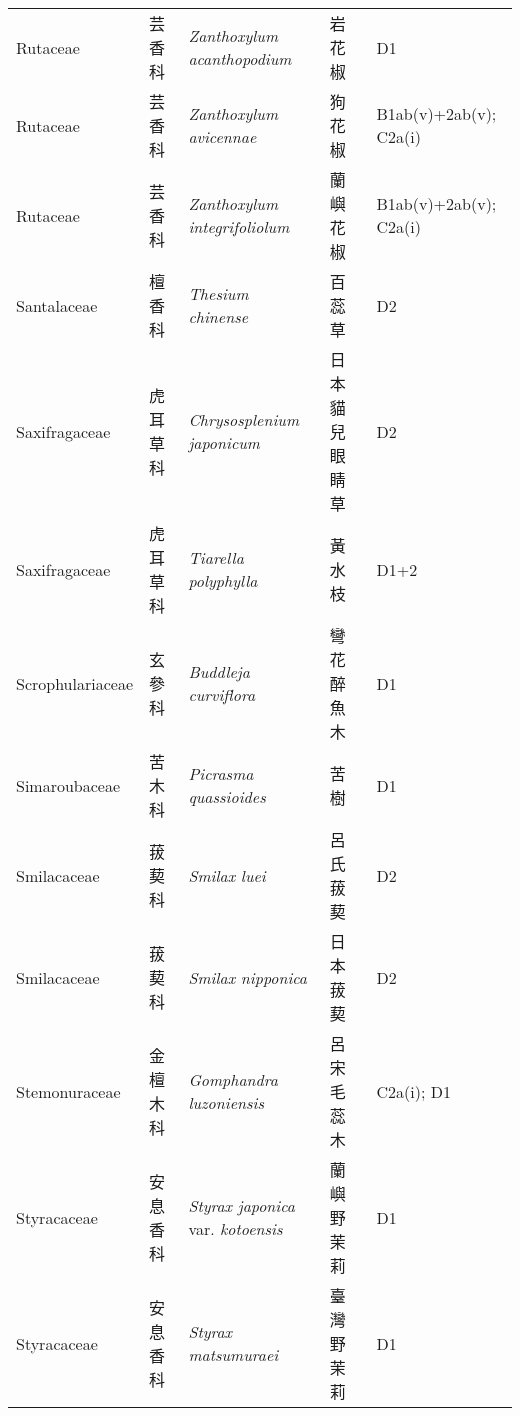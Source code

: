 {\begin{longtable}{p{2.5cm}p{2.5cm}p{4.5cm}p{2.5cm}p{3cm}}
    Rutaceae & 芸香科 & \textit{Zanthoxylum acanthopodium}  & 岩花椒 & D1 \index{Zanthoxylum@\textit{Zanthoxylum}!acanthopodium@\textit{acanthopodium}}  \index{岩花椒} \\
    Rutaceae & 芸香科 & \textit{Zanthoxylum avicennae}  & 狗花椒 & B1ab(v)+2ab(v); C2a(i) \index{Zanthoxylum@\textit{Zanthoxylum}!avicennae@\textit{avicennae}}  \index{狗花椒} \\
    Rutaceae & 芸香科 & \textit{Zanthoxylum integrifoliolum}  & 蘭嶼花椒 & B1ab(v)+2ab(v); C2a(i) \index{Zanthoxylum@\textit{Zanthoxylum}!integrifoliolum@\textit{integrifoliolum}}  \index{蘭嶼花椒} \\
    Santalaceae & 檀香科 & \textit{Thesium chinense}  & 百蕊草 & D2 \index{Thesium@\textit{Thesium}!chinense@\textit{chinense}}  \index{百蕊草} \\
    Saxifragaceae & 虎耳草科 & \textit{Chrysosplenium japonicum}  & 日本貓兒眼睛草 & D2 \index{Chrysosplenium@\textit{Chrysosplenium}!japonicum@\textit{japonicum}}  \index{日本貓兒眼睛草} \\
    Saxifragaceae & 虎耳草科 & \textit{Tiarella polyphylla}  & 黃水枝 & D1+2 \index{Tiarella@\textit{Tiarella}!polyphylla@\textit{polyphylla}}  \index{黃水枝} \\
    Scrophulariaceae & 玄參科 & \textit{Buddleja curviflora}  & 彎花醉魚木 & D1 \index{Buddleja@\textit{Buddleja}!curviflora@\textit{curviflora}}  \index{彎花醉魚木} \\
    Simaroubaceae & 苦木科 & \textit{Picrasma quassioides}  & 苦樹 & D1 \index{Picrasma@\textit{Picrasma}!quassioides@\textit{quassioides}}  \index{苦樹} \\
    Smilacaceae & 菝葜科 & \textit{Smilax luei}  & 呂氏菝葜 & D2 \index{Smilax@\textit{Smilax}!luei@\textit{luei}}  \index{呂氏菝葜} \\
    Smilacaceae & 菝葜科 & \textit{Smilax nipponica}  & 日本菝葜 & D2 \index{Smilax@\textit{Smilax}!nipponica@\textit{nipponica}}  \index{日本菝葜} \\
    Stemonuraceae & 金檀木科 & \textit{Gomphandra luzoniensis}  & 呂宋毛蕊木 & C2a(i); D1 \index{Gomphandra@\textit{Gomphandra}!luzoniensis@\textit{luzoniensis}}  \index{呂宋毛蕊木} \\
    Styracaceae & 安息香科 & \textit{Styrax japonica} var. \textit{kotoensis}  & 蘭嶼野茉莉 & D1 \index{Styrax@\textit{Styrax}!japonica@\textit{japonica}!var. kotoensis@var. \textit{kotoensis}}  \index{蘭嶼野茉莉} \\
    Styracaceae & 安息香科 & \textit{Styrax matsumuraei}  & 臺灣野茉莉 & D1 \index{Styrax@\textit{Styrax}!matsumuraei@\textit{matsumuraei}}  \index{臺灣野茉莉} \\

\end{longtable}}
